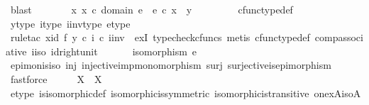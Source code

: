 \begin{isabellebody}
\ blast\isanewline
\ \ \ \ \isamarkupfalse%
\ \isamarkupfalse%
\ {\isachardoublequoteopen}{\isasymexists}x{\isachardot}{\kern0pt}\ x\ {\isasymin}\isactrlsub c\ domain\ e\ {\isasymand}\ e\ {\isasymcirc}\isactrlsub c\ x\ {\isacharequal}{\kern0pt}\ y{\isachardoublequoteclose}\ \isanewline
\ \ \ \ \ \ \isamarkupfalse%
\ cfunc{\isacharunderscore}{\kern0pt}type{\isacharunderscore}{\kern0pt}def\ \isamarkupfalse%
\ y{\isacharunderscore}{\kern0pt}type\ i{\isacharunderscore}{\kern0pt}type\ i{\isacharunderscore}{\kern0pt}inv{\isacharunderscore}{\kern0pt}type\ e{\isacharunderscore}{\kern0pt}type\ \isanewline
\ \ \ \ \ \ \isamarkupfalse%
\ {\isacharparenleft}{\kern0pt}rule{\isacharunderscore}{\kern0pt}tac\ x{\isacharequal}{\kern0pt}{\isachardoublequoteopen}{\isacharparenleft}{\kern0pt}id{\isacharparenleft}{\kern0pt}{\isasymone}{\isacharparenright}{\kern0pt}\ {\isasymtimes}\isactrlsub f\ {\isacharparenleft}{\kern0pt}y\ {\isasymcirc}\isactrlsub c\ i{\isacharparenright}{\kern0pt}\isactrlsup {\isasymsharp}{\isacharparenright}{\kern0pt}\ {\isasymcirc}\isactrlsub c\ i{\isacharunderscore}{\kern0pt}inv{\isachardoublequoteclose}\ \ exI{\isacharcomma}{\kern0pt}\ typecheck{\isacharunderscore}{\kern0pt}cfuncs{\isacharcomma}{\kern0pt}\ metis\ cfunc{\isacharunderscore}{\kern0pt}type{\isacharunderscore}{\kern0pt}def\ comp{\isacharunderscore}{\kern0pt}associative\ i{\isacharunderscore}{\kern0pt}iso\ id{\isacharunderscore}{\kern0pt}right{\isacharunderscore}{\kern0pt}unit{}{\isacharparenright}{\kern0pt}\isanewline
\ \ \isamarkupfalse%
\isanewline
\isanewline
\ \ \isamarkupfalse%
\ {\isachardoublequoteopen}isomorphism\ e{\isachardoublequoteclose}\isanewline
\ \ \ \ \isamarkupfalse%
\ epi{\isacharunderscore}{\kern0pt}mon{\isacharunderscore}{\kern0pt}is{\isacharunderscore}{\kern0pt}iso\ inj\ injective{\isacharunderscore}{\kern0pt}imp{\isacharunderscore}{\kern0pt}monomorphism\ surj\ surjective{\isacharunderscore}{\kern0pt}is{\isacharunderscore}{\kern0pt}epimorphism\ \isamarkupfalse%
\ fastforce\isanewline
\ \ \isamarkupfalse%
\ \isamarkupfalse%
\ {\isachardoublequoteopen}X\isactrlbsup {\isasymone}\isactrlesup \ {\isasymcong}\ X{\isachardoublequoteclose}\isanewline
\ \ \ \ \isamarkupfalse%
\ e{\isacharunderscore}{\kern0pt}type\ is{\isacharunderscore}{\kern0pt}isomorphic{\isacharunderscore}{\kern0pt}def\ isomorphic{\isacharunderscore}{\kern0pt}is{\isacharunderscore}{\kern0pt}symmetric\ isomorphic{\isacharunderscore}{\kern0pt}is{\isacharunderscore}{\kern0pt}transitive\ one{\isacharunderscore}{\kern0pt}x{\isacharunderscore}{\kern0pt}A{\isacharunderscore}{\kern0pt}iso{\isacharunderscore}{\kern0pt}A\ \isamarkupfalse%

\end{isabellebody}

